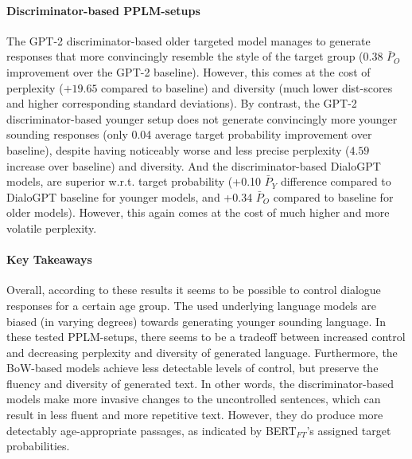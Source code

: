 \paragraph{Discriminator-based PPLM-setups} The GPT-2 discriminator-based older targeted model manages to generate responses that more convincingly resemble the style of the target group (0.38 $\bar{P}_O$ improvement over the GPT-2 baseline). However, this comes at the cost of perplexity ($+19.65$ compared to baseline) and diversity (much lower dist-scores and higher corresponding standard deviations). By contrast, the GPT-2 discriminator-based younger setup does not generate convincingly more younger sounding responses (only 0.04 average target probability improvement over baseline), despite having noticeably worse and less precise perplexity ($4.59$ increase over baseline) and diversity.
And the discriminator-based DialoGPT models, are superior w.r.t. target probability (+0.10 $\bar{P}_Y$ difference compared to DialoGPT baseline for younger models, and +0.34 $\bar{P}_O$ compared to baseline for older models). However, this again comes at the cost of much higher and more volatile perplexity.


\paragraph{Key Takeaways} Overall, according to these results it seems to be possible to control dialogue responses for a certain age group. The used underlying language models are biased (in varying degrees) towards generating younger sounding language. In these tested PPLM-setups, there seems to be a tradeoff between increased control and decreasing perplexity and diversity of generated language. Furthermore, the BoW-based models achieve less detectable levels of control, but preserve the fluency and diversity of generated text. In other words, the discriminator-based models make more invasive changes to the uncontrolled sentences, which can result in less fluent and more repetitive text. However, they do produce more detectably age-appropriate passages, as indicated by BERT$_{FT}$'s assigned target probabilities.

